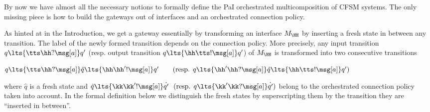 By now we have almost all the necessary notions to formally define the PaI orchestrated multicomposition of CFSM systems.
The only missing piece is how
to build the gateways out of interfaces and an orchestrated connection policy.

As hinted at in the Introduction, we get a gateway essentially by transforming an interface $M_\HH$ by inserting  a fresh state in between any transition. The label of the newly formed transition depends on the connection policy. 
More precisely, any input  transition  $q\lts{\tts\hh?\msg[a]}q'$ (resp. output transition $q\lts{\hh\tts!\msg[a]}q'$) of $M_\HH$ is transformed into two consecutive transitions \\
\centerline{
$q\lts{\tts\hh?\msg[a]}\hat{q} \lts{\hh\hh'!\msg[a]}q'\qquad 
\text{(resp. $q\lts{\hh'\hh?\msg[a]}\hat{q} \lts{\hh\tts!\msg[a]}q'$)}$}
where $\hat{q}$ is a fresh state and 
$\dot{q}\lts{\kk\kk'!\msg[a]}\dot{q'}\,\,\
\text{(resp. $q\lts{\kk'\kk?\msg[a]}\dot{q'}$)}$
belong to 
the orchestrated connection policy taken into account.
In the formal definition below we distinguish the fresh  states by superscripting them
by the transition they are ``inserted in between''.






